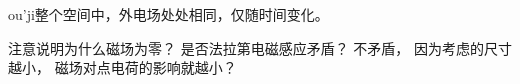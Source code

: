 
\begin{issues}
\issueDraft
\end{issues}

ou'ji整个空间中，外电场处处相同，仅随时间变化。

注意说明为什么磁场为零？ 是否法拉第电磁感应矛盾？ 不矛盾， 因为考虑的尺寸越小， 磁场对点电荷的影响就越小？
